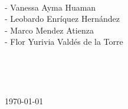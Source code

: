 \begin{titlepage}
	\begin{minipage}{0.4\textwidth}
		\begin{flushleft} \large
			\emph{}\\
- Vanessa Ayma Huaman \\
- Leobardo Enríquez Hernández\\
- Marco Mendez Atienza\\
- Flor Yurivia Valdés de la Torre\\
		\end{flushleft}
	\end{minipage}
	~

	~
	
	
	{\today}\\[2cm] %
	
	

	
	
	\vfill %
	
\end{titlepage}